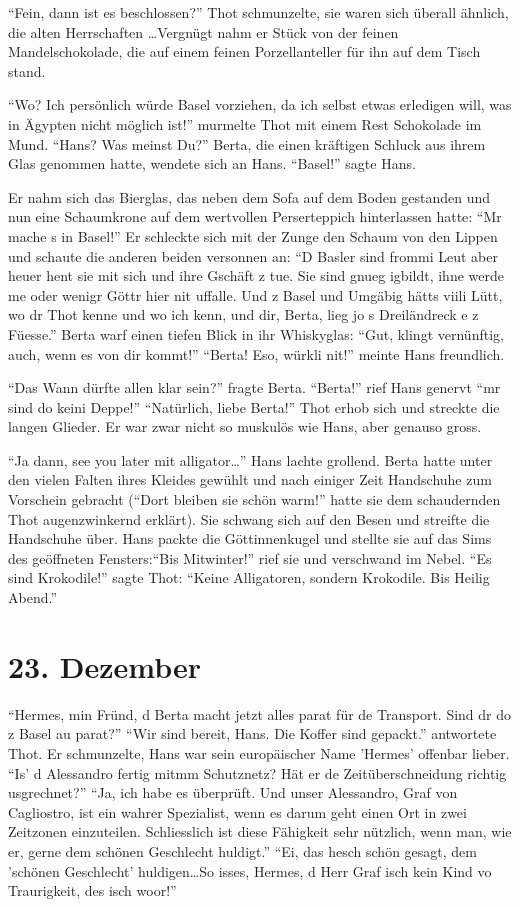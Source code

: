 \documentclass[11pt,titlepage,a5paper]{book}
\begin{document}
 "`Fein, dann ist es beschlossen?"' Thot schmunzelte, sie waren sich überall ähnlich, die alten Herrschaften \dots Vergnügt nahm er Stück von der feinen Mandelschokolade, die auf einem feinen Porzellanteller für ihn auf dem Tisch stand. 

"`Wo? Ich persönlich würde Basel vorziehen, da ich selbst etwas erledigen will, was in Ägypten nicht möglich ist!"' murmelte Thot mit einem Rest Schokolade im Mund. "`Hans? Was meinst Du?"' Berta, die einen kräftigen Schluck aus ihrem Glas genommen hatte, wendete sich an Hans. "`Basel!"' sagte Hans. 

Er nahm sich das Bierglas, das neben dem Sofa auf dem Boden gestanden und nun eine Schaumkrone auf dem wertvollen Perserteppich hinterlassen hatte: "`Mr mache s in Basel!"' Er schleckte sich mit der Zunge den Schaum von den Lippen und schaute die anderen beiden versonnen an: "`D Basler sind frommi Leut aber heuer hent sie mit sich und ihre Gschäft z tue. Sie sind gnueg igbildt, ihne werde me oder wenigr Göttr hier nit uffalle. Und z Basel und Umgäbig hätts viili Lütt, wo dr Thot kenne und wo ich kenn, und dir, Berta, lieg jo s Dreiländreck e z Füesse."' Berta warf einen tiefen Blick in ihr Whiskyglas: "`Gut, klingt vernünftig, auch, wenn es von dir kommt!"' "`Berta! Eso, würkli nit!"' meinte Hans freundlich.   

"`Das Wann dürfte allen klar sein?"' fragte Berta. "`Berta!"' rief Hans genervt "`mr sind do keini Deppe!"' "`Natürlich, liebe Berta!"' Thot erhob sich und streckte die langen Glieder. Er war zwar nicht so muskulös wie Hans, aber genauso gross.

"`Ja dann, see you later mit alligator\dots"' Hans lachte grollend.  Berta hatte unter den vielen Falten ihres Kleides gewühlt und nach einiger Zeit Handschuhe zum Vorschein gebracht ("`Dort bleiben sie schön warm!"' hatte sie dem schaudernden Thot augenzwinkernd erklärt). Sie schwang sich auf den Besen und streifte die Handschuhe über.  Hans packte die Göttinnenkugel und stellte sie auf das Sims des geöffneten Fensters:"`Bis Mitwinter!"' rief sie und verschwand im Nebel. "`Es sind Krokodile!"' sagte Thot: "`Keine Alligatoren, sondern Krokodile. Bis Heilig Abend."'

\section*{23. Dezember}

"`Hermes, min Fründ, d Berta macht jetzt alles parat für de Transport. Sind dr do z Basel au parat?"' "`Wir sind bereit, Hans. Die Koffer sind gepackt."' antwortete Thot. Er schmunzelte, Hans war sein europäischer Name 'Hermes' offenbar lieber. "`Is' d Alessandro fertig mitmm Schutznetz? Hät er de Zeitüberschneidung richtig usgrechnet?"' "`Ja, ich habe es überprüft. Und unser Alessandro, Graf von Cagliostro, ist ein wahrer Spezialist, wenn es darum geht einen Ort in zwei Zeitzonen einzuteilen. Schliesslich ist diese Fähigkeit sehr nützlich, wenn man, wie er, gerne dem schönen Geschlecht huldigt."' "`Ei, das hesch schön gesagt, dem 'schönen Geschlecht' huldigen\dots So isses, Hermes, d Herr Graf isch kein Kind vo Traurigkeit, des isch woor!"' 
\end{document}
